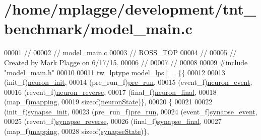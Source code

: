 \hypertarget{model__main_8c_source}{}\section{/home/mplagge/development/tnt\+\_\+benchmark/model\+\_\+main.c}

\begin{DoxyCode}
00001 \textcolor{comment}{//}
00002 \textcolor{comment}{//  model\_main.c}
00003 \textcolor{comment}{//  ROSS\_TOP}
00004 \textcolor{comment}{//}
00005 \textcolor{comment}{//  Created by Mark Plagge on 6/17/15.}
00006 \textcolor{comment}{//}
00007 \textcolor{comment}{//}
00008 
00009 \textcolor{preprocessor}{#include "\hyperlink{model__main_8h}{model\_main.h}"}
00010 
\hypertarget{model__main_8c_source_l00011}{}\hyperlink{model__main_8c_a6acf8f296294224aa8201bdea5aba47e}{00011} tw\_lptype \hyperlink{model__main_8c_a6acf8f296294224aa8201bdea5aba47e}{model\_lps}[] = \{\{
00012 
00013                              (init\_f)\hyperlink{model__main_8c_a8022723eba89664cca80e179b80a2b37}{neuron\_init},
00014                              (pre\_run\_f)\hyperlink{model__main_8c_a7a8df3f99e1d582c6c136b16d6e34d13}{pre\_run},
00015                              (event\_f)\hyperlink{model__main_8c_a9309446aa05714b141a3d3caae4254db}{neuron\_event},
00016                              (revent\_f)\hyperlink{model__main_8c_a5f7d6a6aca030b5db84292b873816fa0}{neuron\_reverse},
00017                              (final\_f)\hyperlink{model__main_8c_acac9e41bea7d1d0911a0220de60a37b0}{neuron\_final},
00018                              (map\_f)\hyperlink{model__main_8c_a9397f1f0e189cd7dac262423993811e4}{mapping},
00019                              \textcolor{keyword}{sizeof}(\hyperlink{structneuron_state}{neuronState})\},
00020                          \{
00021 
00022                              (init\_f)\hyperlink{model__main_8c_a579d8e5af0b1c0a80c8e83b7a534f873}{synapse\_init},
00023                              (pre\_run\_f)\hyperlink{model__main_8c_a7a8df3f99e1d582c6c136b16d6e34d13}{pre\_run},
00024                              (event\_f)\hyperlink{model__main_8c_a4b3ee4a7c010a99b7952de6ee58717c1}{synapse\_event},
00025                              (revent\_f)\hyperlink{model__main_8c_a4a4d6985a03804162eb0a71bbdbc0cc2}{synapse\_reverse},
00026                              (final\_f)\hyperlink{model__main_8c_a3d695e7995cce87a03d6407d801e043d}{synapse\_final},
00027                              (map\_f)\hyperlink{model__main_8c_a9397f1f0e189cd7dac262423993811e4}{mapping},
00028                              \textcolor{keyword}{sizeof}(\hyperlink{structsynapse_state}{synapseState})\},

\end{DoxyCode}
